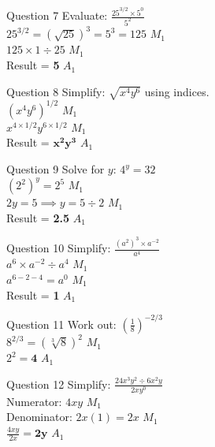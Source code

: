 \documentclass[12pt, a4paper, oneside]{article}
\begin{document}
\begin{solvingbox}{Question 7}
Evaluate: $\frac{25^{3/2} \times 5^0}{5^2}$ \\
$25^{3/2} = (\sqrt{25})^3 = 5^3 = 125$ \hfill $M_1$ \\
$125 \times 1 \div 25$ \hfill $M_1$ \\
Result = \textbf{5} \hfill $A_1$
\end{solvingbox}

\begin{solvingbox}{Question 8}
Simplify: $\sqrt{x^4 y^6}$ using indices. \\
$(x^4 y^6)^{1/2}$ \hfill $M_1$ \\
$x^{4 \times 1/2} y^{6 \times 1/2}$ \hfill $M_1$ \\
Result = $\mathbf{x^2 y^3}$ \hfill $A_1$
\end{solvingbox}

\begin{solvingbox}{Question 9}
Solve for $y$: $4^y = 32$ \\
$(2^2)^y = 2^5$ \hfill $M_1$ \\
$2y = 5 \implies y = 5 \div 2$ \hfill $M_1$ \\
Result = \textbf{2.5} \hfill $A_1$
\end{solvingbox}

\begin{solvingbox}{Question 10}
Simplify: $\frac{(a^2)^3 \times a^{-2}}{a^4}$ \\
$a^6 \times a^{-2} \div a^4$ \hfill $M_1$ \\
$a^{6-2-4} = a^0$ \hfill $M_1$ \\
Result = \textbf{1} \hfill $A_1$
\end{solvingbox}

\begin{solvingbox}{Question 11}
Work out: $(\frac{1}{8})^{-2/3}$ \\
$8^{2/3} = (\sqrt[3]{8})^2$ \hfill $M_1$ \\
$2^2 = \mathbf{4}$ \hfill $A_1$
\end{solvingbox}

\begin{solvingbox}{Question 12}
Simplify: $\frac{24x^3 y^2 \div 6x^2 y}{2xy^0}$ \\
Numerator: $4xy$ \hfill $M_1$ \\
Denominator: $2x(1) = 2x$ \hfill $M_1$ \\
$\frac{4xy}{2x} = \mathbf{2y}$ \hfill $A_1$
\end{solvingbox}
\end{document}
